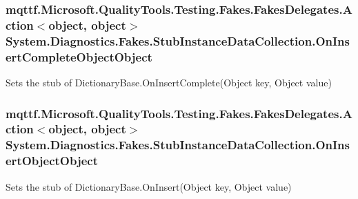 \hypertarget{class_system_1_1_diagnostics_1_1_fakes_1_1_stub_instance_data_collection_a5e9f19c9857a3a9276a89c57965966d3}{
\subsubsection[{On\-Insert\-Complete\-Object\-Object}]{\setlength{\rightskip}{0pt plus 5cm}mqttf.\-Microsoft.\-Quality\-Tools.\-Testing.\-Fakes.\-Fakes\-Delegates.\-Action$<$object, object$>$ System.\-Diagnostics.\-Fakes.\-Stub\-Instance\-Data\-Collection.\-On\-Insert\-Complete\-Object\-Object}}\label{class_system_1_1_diagnostics_1_1_fakes_1_1_stub_instance_data_collection_a5e9f19c9857a3a9276a89c57965966d3}


Sets the stub of Dictionary\-Base.\-On\-Insert\-Complete(\-Object key, Object value)

\hypertarget{class_system_1_1_diagnostics_1_1_fakes_1_1_stub_instance_data_collection_a9b214c09e6945196ed0957f3f7219437}{
\subsubsection[{On\-Insert\-Object\-Object}]{\setlength{\rightskip}{0pt plus 5cm}mqttf.\-Microsoft.\-Quality\-Tools.\-Testing.\-Fakes.\-Fakes\-Delegates.\-Action$<$object, object$>$ System.\-Diagnostics.\-Fakes.\-Stub\-Instance\-Data\-Collection.\-On\-Insert\-Object\-Object}}\label{class_system_1_1_diagnostics_1_1_fakes_1_1_stub_instance_data_collection_a9b214c09e6945196ed0957f3f7219437}


Sets the stub of Dictionary\-Base.\-On\-Insert(\-Object key, Object value)

